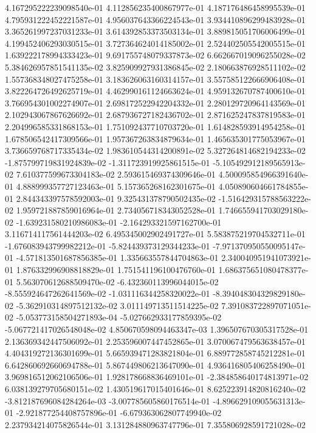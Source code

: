4.167295222239098540e-01
4.112856235400867977e-01
4.187176486458995539e-01
4.795931222452221587e-01
4.956037643366224543e-01
3.934410896299483928e-01
3.365261997237031233e-01
3.614392853373503134e-01
3.889815051706006499e-01
4.199452406293030515e-01
3.727364624014185002e-01
2.524402505542005515e-01
1.639222178994333423e-01
9.691755748079337873e-02
6.662667019096255028e-02
5.384626957851541135e-02
3.825909927931386845e-02
2.180663876928511102e-02
1.557368348027475258e-01
3.183626063160314157e-01
3.557585122666906408e-01
3.822264726492625719e-01
4.462990161124663624e-01
4.959132670787400610e-01
3.766954301002274907e-01
2.698172522942204332e-01
2.280129720964143569e-01
2.102943067867626692e-01
2.687936727182436702e-01
2.871625247837819583e-01
2.204996585331868153e-01
1.751092437710703720e-01
1.614828593914954258e-01
1.678506542417309566e-01
1.957367263834879634e-01
1.465635301775053967e-01
3.736659768717335434e-02
1.983610544314200891e-02
5.327264814682194233e-02
-1.875799719831924839e-02
-1.311723919925861515e-01
-5.105492912189565913e-02
7.610377599673304183e-02
2.593615469374309646e-01
4.500095854966391640e-01
4.888999357727123463e-01
5.157365268162301675e-01
4.050890604661784855e-01
2.844343397578592003e-01
9.325431378790502435e-02
-1.516429315788563222e-02
1.959721887859016964e-01
2.734056718343052528e-01
1.746655941703029180e-02
-1.639231580210986083e-01
-2.164293321597162700e-01
3.116714117561444203e-02
6.495345002902491727e-01
5.583875219704532711e-01
-1.676083943799982212e-01
-5.824439373129344233e-01
-7.971370950550095147e-01
-4.571813501687856385e-01
1.335663557844704863e-01
2.340040951941073921e-01
1.876332996908818829e-01
1.751541196100476760e-01
1.686375651080478377e-01
5.563070612688509470e-02
-6.432360113996044015e-02
-8.555924647262641569e-02
-1.031116344258320022e-01
-8.394048304329829180e-02
-5.362910314897512132e-02
3.011149713511514225e-02
7.391083722897071051e-02
-5.053773158504271893e-04
-5.027662933177859395e-02
-5.067721417026548048e-02
4.850670598094463347e-03
1.396507670305317528e-01
2.136369342447506092e-01
2.253596007447452865e-01
3.070067479563638457e-01
4.404319272136301699e-01
5.665939471283821804e-01
6.889772858745212281e-01
6.642860692660694788e-01
5.867449806213647090e-01
4.936416805406258490e-01
3.969816512062106506e-01
1.928178668836469101e-01
-2.384858640174813971e-02
6.038139279705680151e-02
1.430519617015401646e-01
8.625223914820816240e-02
-3.812187696084284264e-03
-3.007785605860176514e-01
-4.896629109055631313e-01
-2.921877254408757896e-01
-6.679363062807749940e-02
2.237934214075826544e-01
3.131284880963747796e-01
7.355806928591721028e-02
